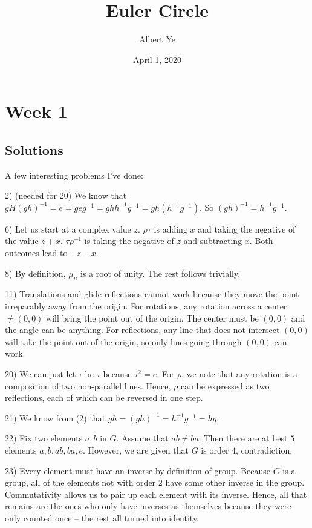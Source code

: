 \documentclass{scrartcl}
\title{Euler Circle}
\author{Albert Ye}
\date{April 1, 2020}
\begin{document}
\maketitle

\section{Week 1}
\subsection{Solutions}
A few interesting problems I've done:

2) (needed for 20) We know that $gH(gh)^{-1} = e = geg^{-1} = ghh^{-1}g^{-1} = gh(h^{-1}g^{-1})$. So $(gh)^{-1} = h^{-1}g^{-1}$. \blackqed

6) Let us start at a complex value $z$. $\rho \tau$ is adding $x$ and taking the negative of the value $z+x$. $\tau \rho^{-1}$ is taking the negative of $z$ and subtracting $x$. Both outcomes lead to $-z-x$. \blackqed

8) By definition, $\mu_n$ is a root of unity. The rest follows trivially. \blackqed

11) Translations and glide reflections cannot work because they move the point irreparably away from the origin. For rotations, any rotation across a center $\ne (0, 0)$ will bring the point out of the origin. The center must be $(0,0)$ and the angle can be anything. For reflections, any line that does not intersect $(0,0)$ will take the point out of the origin, so only lines going through $(0,0)$ can work.

20) We can just let $\tau$ be $\tau$ because $\tau^2 = e$. For $\rho$, we note that any rotation is a composition of two non-parallel lines. Hence, $\rho$ can be expressed as two reflections, each of which can be reversed in one step. \blackqed 

21) We know from (2) that $gh = (gh)^{-1} = h^{-1}g^{-1} = hg$. \blackqed 

22) Fix two elements $a,b$ in $G$. Assume that $ab \ne ba$. Then there are at best $5$ elements $a,b,ab,ba,e$. However, we are given that $G$ is order $4$, contradiction. \blackqed

23) Every element must have an inverse by definition of group. Because $G$ is a group, all of the elements not with order $2$ have some other inverse in the group. Commutativity allows us to pair up each element with its inverse. Hence, all that remains are the ones who only have inverses as themselves because they were only counted once -- the rest all turned into identity. 
\end{document}
